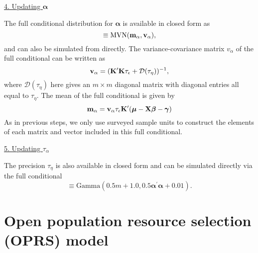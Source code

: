 \documentclass[12pt,fleqn]{article}
\begin{document}
\begin{flushleft}
\underline{4. Updating $\boldsymbol{\alpha}$}

The full conditional distribution for $\boldsymbol{\alpha}$ is available in closed form as
\begin{equation*}
  [\boldsymbol{\alpha} | \cdot] \equiv \textrm{MVN}({\bf m}_{\alpha},{\bf v}_{\alpha}),
\end{equation*}
and can also be simulated from directly.  The variance-covariance matrix $v_{\alpha}$ of the full conditional can be written as
\begin{equation*}
  {\bf v}_{\alpha} = ({\bf K}^{\prime}{\bf K} \tau_\epsilon + \mathcal{D}(\tau_\eta))^{-1},
\end{equation*}
where $\mathcal{D}(\tau_\eta)$ here gives an $m \times m$ diagonal matrix with diagonal entries all equal to $\tau_\eta$.  The mean of the full conditional is given by
\begin{equation*}
  {\bf m}_{\alpha} = {\bf v}_\alpha \tau_\epsilon {\bf K}^\prime (\boldsymbol{\mu}- {\bf X} \boldsymbol{\beta} - \boldsymbol{\gamma})
\end{equation*}
As in previous steps, we only use surveyed sample units to construct the elements of each matrix and vector included in this full conditional.

\underline{5. Updating $\tau_\alpha$}

The precision $\tau_\eta$ is also available in closed form and can be simulated directly via the full conditional
\begin{equation*}
  [\tau_\eta | \cdot] \equiv \textrm{Gamma}(0.5m + 1.0,0.5 \boldsymbol{\alpha}^\prime \boldsymbol{\alpha} + 0.01).
\end{equation*}

\section{Open population resource selection (OPRS) model}


\end{flushleft}
\end{document}
